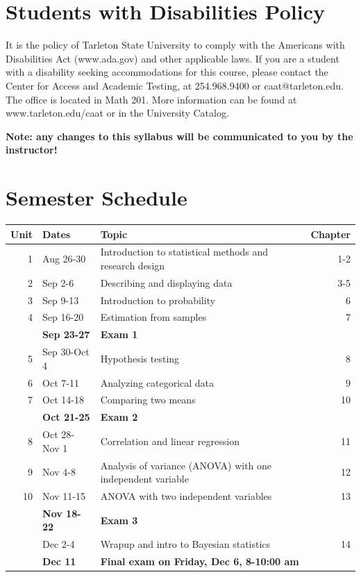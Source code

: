 \documentclass[10pt]{article}
\begin{document}
\section*{Students with Disabilities Policy}
\label{sec:org1e2ea26}

It is the policy of Tarleton State University to comply with the Americans with Disabilities  Act (www.ada.gov) and other applicable laws.  If you are a student with a disability seeking accommodations for this course, please contact the Center for Access and Academic Testing, at 254.968.9400 or caat@tarleton.edu. The office is located in Math 201. More information can be found at www.tarleton.edu/caat or in the University Catalog.​

\textbf{Note:  any changes to this syllabus will be communicated to you by the instructor!}

\newpage

\section*{Semester Schedule}
\label{sec:orgdac039d}
\begin{center}
\begin{tabular}{rllr}
Unit & Dates & Topic & Chapter\\
\hline
1 & Aug 26-30 & Introduction to statistical methods and research design & 1-2\\
2 & Sep 2-6 & Describing and displaying data & 3-5\\
3 & Sep 9-13 & Introduction to probability & 6\\
4 & Sep 16-20 & Estimation from samples & 7\\
 & \textbf{Sep 23-27} & \textbf{Exam 1} & \\
5 & Sep 30-Oct 4 & Hypothesis testing & 8\\
6 & Oct 7-11 & Analyzing categorical data & 9\\
7 & Oct 14-18 & Comparing two means & 10\\
 & \textbf{Oct 21-25} & \textbf{Exam 2} & \\
8 & Oct 28-Nov 1 & Correlation and linear regression & 11\\
9 & Nov 4-8 & Analysis of variance (ANOVA) with one independent variable & 12\\
10 & Nov 11-15 & ANOVA with two independent variables & 13\\
 & \textbf{Nov 18-22} & \textbf{Exam 3} & \\
 & Dec 2-4 & Wrapup and intro to Bayesian statistics & 14\\
 & \textbf{Dec 11} & \textbf{Final exam on Friday, Dec 6, 8-10:00 am} & \\
\end{tabular}
\end{center}
\end{document}
